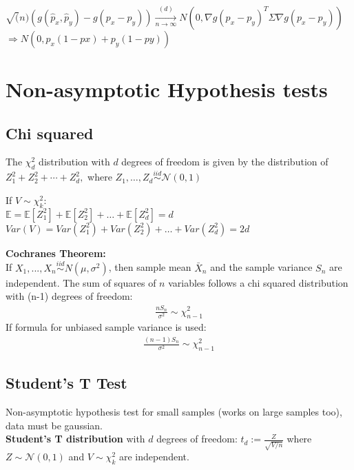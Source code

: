 $\sqrt(n) (g(\hat{p}_x,\hat{p}_y) - g(p_x-p_y)) \xrightarrow[n \rightarrow \infty]{(d)} N(0,\nabla g(p_x-p_y)^T \Sigma \nabla g(p_x-p_y))$\\ 

$\Rightarrow N(0,p_x(1-px) + p_y(1-py))$

\section{Non-asymptotic Hypothesis tests}

\subsection{Chi squared}
The $\chi _ d^2$ distribution with $d$ degrees of freedom is given by the distribution of $Z_1^2 + Z_2^2 + \cdots + Z_ d^2,$ where $Z_1, \ldots , Z_ d \stackrel{iid}{\sim } \mathcal{N}(0,1)$

If $V \sim \chi^2_k:$\\

$\mathbb{E}= \mathbb{E}[Z_1^2] + \mathbb{E}[Z_2^2] + \ldots + \mathbb{E}[Z_d^2] = d$\\ 

$Var(V) = Var(Z_1^2) + Var(Z_2^2) + \ldots + Var(Z_d^2) = 2d$

\textbf{Cochranes Theorem:}\\
If $X_1, ..., X_n \stackrel{iid}{\sim} N(\mu,\sigma^2)$, then sample mean $\bar{X}_n$ and the sample variance $S_n$ are independent. The sum of squares of $n$ variables follows a chi squared distribution with (n-1) degrees of freedom:
\begin{align*}
\frac{n S_ n}{\sigma ^2} \sim \chi _{n -1}^2
\end{align*}
If formula for unbiased sample variance is used:\\
\begin{align*}
\frac{(n-1) S_ n}{\sigma ^2} \sim \chi _{n -1}^2
\end{align*}
\subsection{Student's T Test}
Non-asymptotic hypothesis test for small samples (works on large samples too), data must be gaussian.\\

\textbf{Student's T distribution} with $d$ degrees of freedom:
$t_d := \frac{Z}{\sqrt{V/n}}$ where $Z \sim \mathcal{N}(0,1)$ and $V \sim \chi^2_k$ are independent.\\

